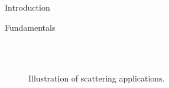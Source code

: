 \documentclass[journal]{IEEEtran}
\begin{document}
\begin{section}{Introduction}
\begin{subsection}{Fundamentals}
		\begin{figure}[!t]
			\centering
			\\
			\subfloat[\gls{sr}]{
				\resizebox{0.48\linewidth}{!}{
					
				}
				\label{fi:sr}
			}
			\\
			\subfloat[RIScatter]{
				\resizebox{0.48\linewidth}{!}{
					
				}
				\label{fi:riscatter}
			}
			\caption{
				Illustration of scattering applications.
			}
			\label{fi:scatter_comparison}
		\end{figure}
	\end{subsection}


\end{section}
\end{document}
